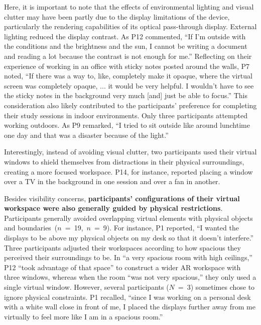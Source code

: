Here, it is important to note that the effects of environmental lighting and visual clutter may have been partly due to the display limitations of the device, particularly the rendering capabilities of its optical pass-through display. 
External lighting reduced the display contrast. 
As P12 commented, ``If I'm outside with the conditions and the brightness and the sun, I cannot be writing a document and reading a lot because the contrast is not enough for me.'' 
Reflecting on their experience of working in an office with sticky notes posted around the walls, 
P7 noted, 
``If there was a way to, like, completely make it opaque, where the virtual screen was completely opaque, ... it would be very helpful. I wouldn't have to see the sticky notes in the background very much [and] just be able to focus.''
This consideration also likely contributed to the participants' preference for completing their study sessions in indoor environments. 
Only three participants attempted working outdoors. 
As P9 remarked, ``I tried to sit outside like around lunchtime one day and that was a disaster because of the light.'' 

Interestingly, instead of avoiding visual clutter, two participants
used their virtual windows to shield themselves from distractions in their physical surroundings, creating a more focused workspace.
P14, for instance, 
reported placing a window over a TV in the background in one session and over a fan in another.

Besides visibility concerns, 
\textbf{participants' configurations of their virtual workspace were also generally guided by physical restrictions}.
Participants generally avoided overlapping virtual elements with physical objects and boundaries~($n$~=~19,~$n$~=~9).
For instance, P1 reported, ``I wanted the displays to be above my physical objects on my desk so that it doesn't interfere.''
Three participants
adjusted their workspaces according to how spacious they perceived their surroundings to be. 
In ``a very spacious room with high ceilings,'' P12 ``took advantage of that space'' to construct a wider AR workspace with three windows, whereas when the room ``was not very spacious,'' they only used a single virtual window.
However, several participants ($N$~=~3)
sometimes chose to ignore physical constraints. 
P1 recalled, ``since I was working on a personal desk with a white wall close in front of me, I placed the displays further away from me virtually to feel more like I am in a spacious room.'' 

